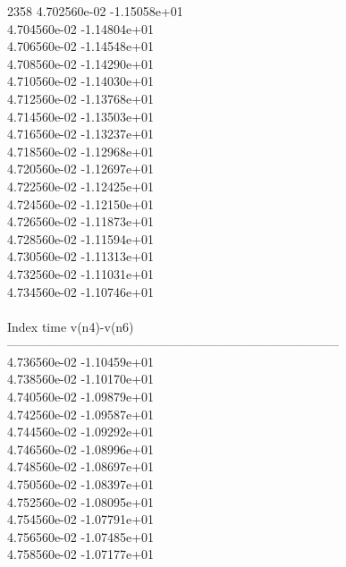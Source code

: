 2358	4.702560e-02	-1.15058e+01	\\ 	4.704560e-02	-1.14804e+01	\\ 	4.706560e-02	-1.14548e+01	\\ 	4.708560e-02	-1.14290e+01	\\ 	4.710560e-02	-1.14030e+01	\\ 	4.712560e-02	-1.13768e+01	\\ 	4.714560e-02	-1.13503e+01	\\ 	4.716560e-02	-1.13237e+01	\\ 	4.718560e-02	-1.12968e+01	\\ 	4.720560e-02	-1.12697e+01	\\ 	4.722560e-02	-1.12425e+01	\\ 	4.724560e-02	-1.12150e+01	\\ 	4.726560e-02	-1.11873e+01	\\ 	4.728560e-02	-1.11594e+01	\\ 	4.730560e-02	-1.11313e+01	\\ 	4.732560e-02	-1.11031e+01	\\ 	4.734560e-02	-1.10746e+01	\\ \hline
\\ \hline
Index   time            v(n4)-v(n6)     \\ \hline
--------------------------------------------------------------------------------\\ 	4.736560e-02	-1.10459e+01	\\ 	4.738560e-02	-1.10170e+01	\\ 	4.740560e-02	-1.09879e+01	\\ 	4.742560e-02	-1.09587e+01	\\ 	4.744560e-02	-1.09292e+01	\\ 	4.746560e-02	-1.08996e+01	\\ 	4.748560e-02	-1.08697e+01	\\ 	4.750560e-02	-1.08397e+01	\\ 	4.752560e-02	-1.08095e+01	\\ 	4.754560e-02	-1.07791e+01	\\ 	4.756560e-02	-1.07485e+01	\\ 	4.758560e-02	-1.07177e+01	\\ \hline
